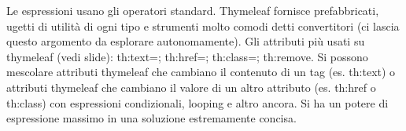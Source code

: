 Le espressioni usano gli operatori standard.\newline
\newline
Thymeleaf fornisce prefabbricati, ugetti di utilità di ogni tipo e strumenti molto comodi detti convertitori (ci lascia questo argomento da esplorare autonomamente).\newline
\newline
Gli attributi più usati su thymeleaf (vedi slide): th:text=; th:href=; th:class=; th:remove. \newline
\newline
Si possono mescolare attributi thymeleaf che cambiano il contenuto di un tag (es. th:text) o attributi thymeleaf che cambiano il valore di un altro attributo (es. th:href o th:class) con espressioni condizionali, looping e altro ancora. Si ha un potere di espressione massimo in una soluzione estremamente concisa.